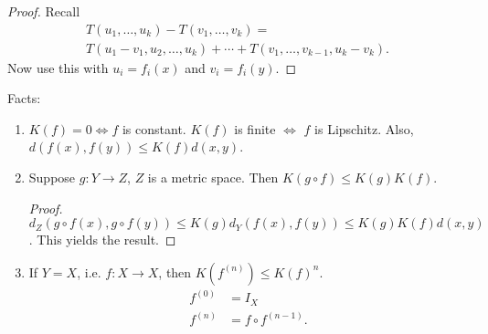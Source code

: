 \documentclass{report}
\begin{document}
{\begin{enumerate}
        \begin{proof}
            Recall 
            \begin{align*}
                T(u_1, \ldots, u_k) - T(v_1, \ldots, v_k) = \\
                T(u_1 - v_1, u_2, \ldots, u_k) + \cdots + T(v_1, \ldots, v_{k-1}, u_k - v_k).
            \end{align*}
            Now use this with $u_i = f_i(x)$ and $v_i = f_i(y)$. 

        \end{proof}
    \end{enumerate}
}

\noindent Facts:
\begin{enumerate}
    \item $K(f) = 0 \iff f$ is constant. $K(f)$ is finite $\iff$ $f$ is Lipschitz. Also, $d(f(x), f(y)) \leq K(f) d(x, y)$. 
    \item Suppose $g: Y \to Z$, $Z$ is a metric space. Then $K(g \circ f) \leq K(g) K(f)$. 
    \begin{proof}
        $d_Z(g \circ f(x), g \circ f(y)) \leq K(g) d_Y(f(x), f(y)) \leq K(g)K(f)d(x, y)$. This yields the result. 
    \end{proof}
    \item If $Y = X$, i.e. $f: X \to X$, then $K(f^{(n)}) \leq K(f)^n$. 
    \begin{align*}
        f^{(0)} &= I_X \\
        f^{(n)} &= f \circ f^{(n-1)}.
    \end{align*}
\end{enumerate}
\end{document}
